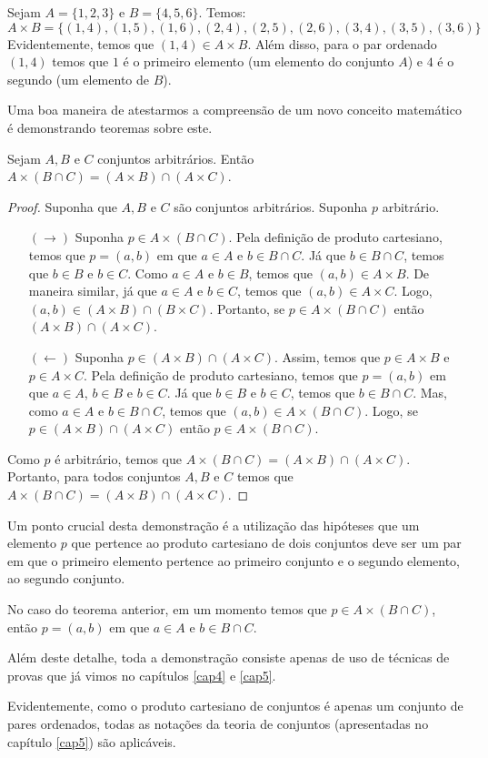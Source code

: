 \begin{Example}
Sejam $A =\{1,2,3\}$ e $B = \{4,5,6\}$. Temos:
\[
A \times B = \{(1,4),(1,5),(1,6),(2,4),(2,5),(2,6),(3,4),(3,5),(3,6)\}
\]
Evidentemente, temos que $(1,4) \in A \times B$. Além disso, para o
par ordenado $(1,4)$ temos que $1$ é o primeiro elemento (um elemento
do conjunto $A$) e $4$ é o segundo (um elemento de $B$).
\end{Example}
Uma boa maneira de atestarmos a compreensão de um novo conceito
matemático é demonstrando teoremas sobre este.
\begin{Theorem}
Sejam $A, B$ e $C$ conjuntos arbitrários. Então $A \times (B\cap C) =
(A \times B) \cap (A \times C)$.
\end{Theorem}
\begin{proof}
Suponha que $A,B$ e $C$ são conjuntos arbitrários. Suponha $p$
arbitrário.
\begin{itemize}
   \item[$(\to)$] Suponha $p \in A \times (B \cap C)$. Pela definição
     de produto cartesiano, temos que $p = (a,b)$ em que $a \in A$ e
     $b \in B \cap C$. Já que $b\in B\cap C$, temos que $b \in B$ e $b
     \in C$. Como $a \in A$ e $b \in B$, temos que $(a,b)\in A \times
     B$. De maneira similar, já que $a \in A$ e $b \in C$, temos que
     $(a,b) \in A \times C$. Logo, $(a,b) \in (A\times B) \cap
     (B\times C)$. Portanto, se $p \in A\times (B\cap C)$ então
     $(A\times B)\cap (A \times C)$.
   \item[$(\leftarrow)$] Suponha $p\in (A\times B) \cap (A \times
     C)$. Assim, temos que $p \in A \times B$ e $p \in A \times C$.
     Pela definição de produto cartesiano, temos que $p = (a,b)$ em
     que $a \in A$, $b \in B$ e $b\in C$. Já que $b\in B$ e $b\in C$,
     temos que $b\in B\cap C$. Mas, como $a \in A$ e $b\in B\cap C$,
     temos que $(a,b)\in A\times (B\cap C)$. Logo, se $p \in (A\times
     B) \cap (A \times C)$ então $p \in A \times (B\cap C)$.
\end{itemize}
Como $p$ é arbitrário, temos que $A \times (B\cap C) = (A \times B)
\cap (A \times C)$. Portanto, para todos conjuntos $A,B$ e $C$ temos
que $A \times (B\cap C) = (A \times B)
\cap (A \times C)$.
\end{proof}

\begin{Commentary}
Um ponto crucial desta demonstração é a utilização das hipóteses que
um elemento $p$ que pertence ao produto cartesiano de dois conjuntos
deve ser um par em que o primeiro elemento pertence ao primeiro
conjunto e o segundo elemento, ao segundo conjunto.

No caso do teorema anterior, em um momento temos que $p \in A \times
(B\cap C)$, então $p = (a,b)$ em que $a \in A$ e $b \in B\cap C$.

Além deste
detalhe, toda a demonstração consiste apenas de uso de técnicas de
provas que já vimos no capítulos \ref{cap4} e \ref{cap5}.

Evidentemente, como o produto cartesiano de conjuntos é apenas um
conjunto de pares ordenados, todas as notações da teoria de conjuntos
(apresentadas no capítulo \ref{cap5}) são aplicáveis.
\end{Commentary}

